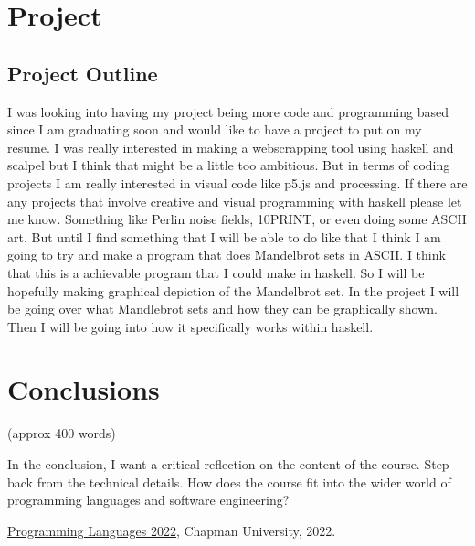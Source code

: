 \documentclass{article}
\theoremstyle{theorem}
\theoremstyle{definition}
\theoremstyle{remark}
\begin{document}
\section{Project}\label{Project}
\subsection{Project Outline }
I was looking into having my project being more code and programming based since I am graduating soon and would like to have a project to put on my resume. I was really interested in making a webscrapping tool using haskell and scalpel but I think that might be a little too ambitious. But in terms of coding projects I am really interested in visual code like p5.js and processing. If there are any projects that involve creative and visual programming with haskell please let me know. Something like Perlin noise fields, 10PRINT, or even doing some ASCII art. But until I find something that I will be able to do like that I think I am going to try and make a program that does Mandelbrot sets in ASCII. I think that this is a achievable program that I could make in haskell. So I will be hopefully making graphical depiction of the Mandelbrot set. In the project I will be going over what Mandlebrot sets and how they can be graphically shown. Then I will be going into how it specifically works within haskell.

\section{Conclusions}\label{conclusions}

(approx 400 words)

In the conclusion, I want a critical reflection on the content of the course. Step back from the technical details. How does the course fit into the wider world of programming languages and software engineering?

\begin{thebibliography}{99}
 \href{https://github.com/alexhkurz/programming-languages-2022/blob/main/README.md}{Programming Languages 2022}, Chapman University, 2022.
\end{thebibliography}
\end{document}
